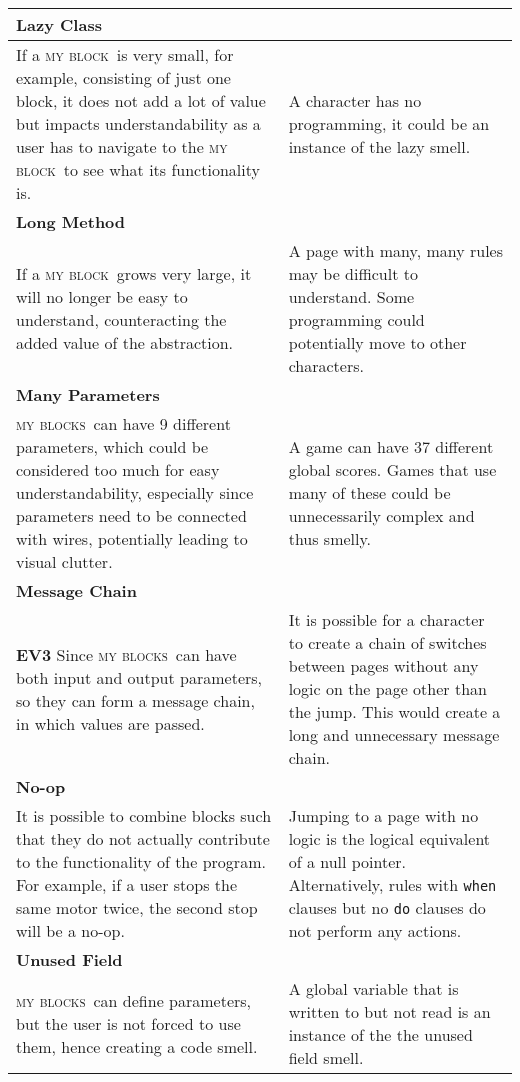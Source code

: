\documentclass[conference]{IEEEtran}
\newcommand{\mbs}{\textsc{my blocks}}
\newcommand{\mb}{\textsc{my block}}
\begin{document}
\begin{table*}
\begin{tabular}{| p{3.38in} | p{3.37in} |}
\textbf{Lazy Class} \\ \hline
If a \mb~is very small, for example, consisting of just one block, it does not add a lot of value but impacts understandability as a user has to navigate to the \mb~to see what its functionality is. 
& A character has no programming, it could be an instance of the lazy smell. \\ \hline
\textbf{Long Method} \\ \hline
 If a \mb~grows very large, it will no longer be easy to understand, counteracting the added value of the abstraction. & A page with many, many rules may be difficult to understand. Some programming could potentially move to other characters.\\ \hline
\textbf{Many Parameters} \\ \hline
 \mbs~can have 9 different parameters, which could be considered too much for easy understandability, especially since parameters need to be connected with wires, potentially leading to visual clutter. 
 & A game can have 37 different global scores. Games that use many of these could be unnecessarily complex and thus smelly.\\ \hline
\textbf{Message Chain} \\ \hline
\textbf{EV3} Since \mbs~can have both input and output parameters, so they can form a message chain, in which values are passed. 
& It is possible for a character to create a chain of switches between pages without any logic on the page other than the jump. This would create a long and unnecessary message chain.\\ \hline
\textbf{No-op} \\ \hline 
 It is possible to combine blocks such that they do not actually contribute to the functionality of the program. For example, if a user stops the same motor twice, the second stop will be a no-op.
 & Jumping to a page with no logic is the logical equivalent of a null pointer. 
 Alternatively, rules with {\tt when} clauses but no {\tt do} clauses do not perform any actions.\\ \hline
\textbf{Unused Field} \\ \hline
 \mbs~can define parameters, but the user is not forced to use them, hence creating a code smell.
 & A global variable that is written to but not read is an instance of the the unused field smell.\\ \hline
\end{tabular}
\end{table*}
\end{document}
